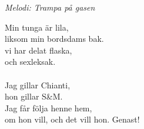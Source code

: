 {\footnotesize\textit{Melodi: Trampa på gasen}}\par
\vspace{10pt}
Min tunga är lila,\\
liksom min bordsdams bak.\\
vi har delat flaska,\\
och sexleksak.\\
\\
Jag gillar Chianti,\\
hon gillar S&M.\\
Jag får följa henne hem,\\
om hon vill, och det vill hon. Genast!

